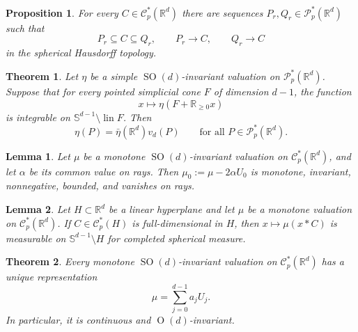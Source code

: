 \documentclass[10pt,a4paper]{amsart}
\newtheorem{proposition}{Proposition}
\newtheorem{theorem}{Theorem}
\newtheorem{lemma}{Lemma}
\newcommand{\CC}{\mathcal{C}}
\newcommand{\On}[1]{\operatorname{O}(#1)}
\newcommand{\PP}{\mathcal{P}}
\newcommand{\R}{\mathbb{R}}
\newcommand{\SOn}[1]{\operatorname{SO}(#1)}
\newcommand{\lin}{\operatorname{lin}}
\newcommand{\sphere}[1]{\mathbb{S}^{#1}}
\begin{document}
\begin{proposition}\label{prop:polyhedral-sandwich}
For every $C\in\CC_p^*(\R^d)$ there are sequences
$P_r,Q_r\in\PP_p^*(\R^d)$ such that
\begin{equation*}
  P_r\subseteq C\subseteq Q_r,
  \qquad P_r\rightarrow C,
  \qquad Q_r\rightarrow C
\end{equation*}
in the spherical Hausdorff topology.
\end{proposition}

\begin{theorem}\label{thm:simple-integrable}
Let $\eta$ be a simple $\SOn d$-invariant valuation on
$\PP_p^*(\R^d)$.  Suppose that for every pointed simplicial cone $F$
of dimension $d-1$, the function
\[
  x\longmapsto\eta(F+\R_{\ge0}x)
\]
is integrable on $\sphere{d-1}\setminus\lin F$.
Then
\[
  \eta(P)=\bar\eta(\R^d)v_d(P)
  \qquad\text{for all }P\in\PP_p^*(\R^d).
\]
\end{theorem}

\begin{lemma}\label{lem:normalization}
Let $\mu$ be a monotone $\SOn d$-invariant valuation on
$\CC_p^*(\R^d)$, and let $\alpha$ be its common value on rays.
Then $\mu_0:=\mu-2\alpha U_0$ is monotone, invariant, nonnegative,
bounded, and vanishes on rays.
\end{lemma}

\begin{lemma}\label{lem:measurable-coning}
Let $H\subset\R^d$ be a linear hyperplane and let $\mu$ be a monotone
valuation on $\CC_p^*(\R^d)$.
If $C\in\CC_p^*(H)$ is full-dimensional in $H$, then
$x\mapsto\mu(x*C)$ is measurable on $\sphere{d-1}\setminus H$
for completed spherical measure.
\end{lemma}

\begin{theorem}\label{thm:regularity}
Every monotone $\SOn d$-invariant valuation on $\CC_p^*(\R^d)$
has a unique representation
\begin{equation}\label{eq:pointed-representation}
  \mu=\sum_{j=0}^{d-1}a_jU_j.
\end{equation}
In particular, it is continuous and $\On d$-invariant.
\end{theorem}
\end{document}
